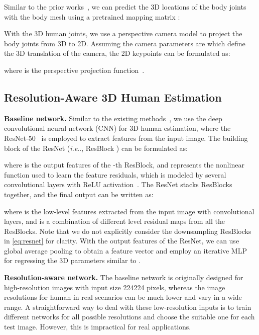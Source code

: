 \documentclass[runningheads]{llncs}
\makeatletter
\DeclareRobustCommand\onedot{\futurelet\@let@token\@onedot}
\def\@onedot{\ifx\@let@token.\else.\null\fi\xspace}
\def\ie{\emph{i.e}\onedot, } \def\Ie{\emph{I.e}\onedot}
\makeatother
\begin{document}
Similar to the prior works~\cite{kanazawa2018end,kolotouros2019spin}, we can predict the 3D locations of the body joints  with the body mesh using a pretrained mapping matrix :

With the 3D human joints, we use a perspective camera model to project the body joints from 3D to 2D. Assuming the camera parameters are  which define the 3D translation of the camera, the 2D keypoints can be formulated as:

where  is the perspective projection function~\cite{hartley2003multiple}. 


\subsection{Resolution-Aware 3D Human Estimation} \label{sec:res-aware}



\noindent \textbf{Baseline network.}
Similar to the existing methods~\cite{kanazawa2018end,kolotouros2019spin}, we use the deep convolutional neural network (CNN) for 3D human estimation, where the ResNet-50~\cite{resnet} is employed to extract features from the input image. 
The building block of the ResNet (\ie ResBlock \cite{he2016identity}) can be formulated as:

where  is the output features of the -th ResBlock, and  represents the nonlinear function used to learn the feature residuals, which is modeled by several convolutional layers with ReLU activation~\cite{nair2010rectified}.
The ResNet stacks  ResBlocks together, and the final output can be written  as: 
  
where  is the low-level features extracted from the input image  with convolutional layers, and  is a combination of different level residual maps from all the ResBlocks. 
Note that we do not explicitly consider the downsampling ResBlocks in \eqref{eq:resnet} for clarity.
With the output features of the ResNet, we can use global average pooling to obtain a feature vector  and employ an iterative MLP for regressing the 3D parameters  similar to \cite{kanazawa2018end,kolotouros2019spin}.








\noindent \textbf{Resolution-aware network.}
The baseline network is originally designed for high-resolution images with input size 224224 pixels,
whereas the image resolutions for human in real scenarios can be much lower and vary in a wide range. 
A straightforward way to deal with these low-resolution inputs is to train different networks for all possible resolutions and choose the suitable one for each test image.
However, this is impractical for real applications. 
\end{document}

